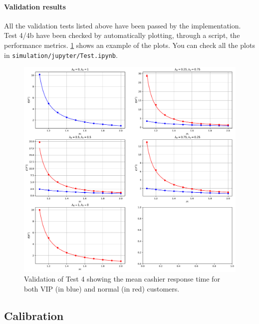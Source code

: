 \paragraph{Validation results}
All the validation tests listed above have been passed by the implementation.
Test 4/4b have been checked by automatically plotting, through a script,
the performance metrics. \cref{fig:validation} shows an example of the plots.
You can check all the plots in \texttt{simulation/jupyter/Test.ipynb}.

\begin{figure}[]
    \centering
    \includegraphics[width=\textwidth]{figs/validation.pdf}
    \caption{Validation of Test 4 showing the mean cashier response time for 
        both VIP (in blue) and normal (in red) customers.}
    \label{fig:validation}
\end{figure}

\subsection{Calibration}

